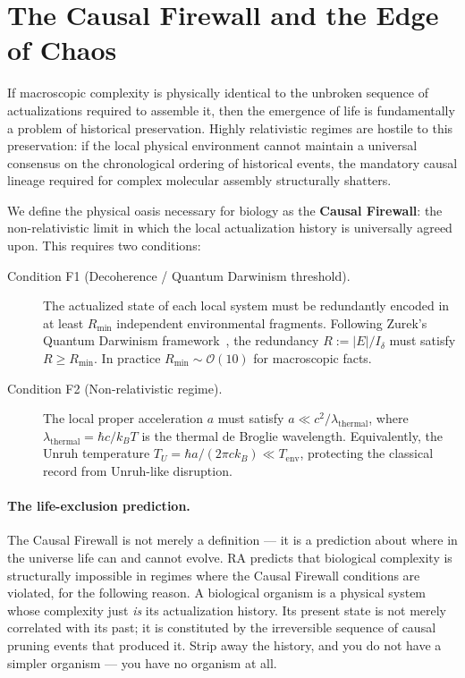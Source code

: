 \documentclass[11pt,a4paper]{article}
\theoremstyle{plain}
\theoremstyle{definition}
\theoremstyle{remark}
\begin{document}
\section{The Causal Firewall and the Edge of Chaos}
\label{sec:firewall}

If macroscopic complexity is physically identical to the unbroken sequence of
actualizations required to assemble it, then the emergence of life is fundamentally
a problem of historical preservation. Highly relativistic regimes are hostile to
this preservation: if the local physical environment cannot maintain a universal
consensus on the chronological ordering of historical events, the mandatory causal
lineage required for complex molecular assembly structurally shatters.

We define the physical oasis necessary for biology as the \textbf{Causal Firewall}:
the non-relativistic limit in which the local actualization history is universally
agreed upon. This requires two conditions:

\begin{description}
  \item[Condition F1 (Decoherence / Quantum Darwinism threshold).]
  The actualized state of each local system must be redundantly encoded in at least
  $R_{\min}$ independent environmental fragments. Following Zurek's Quantum Darwinism
  framework~\citep{Zurek2009}, the redundancy $R := |E|/I_{\delta}$ must satisfy
  $R \geq R_{\min}$. In practice $R_{\min} \sim \mathcal{O}(10)$ for macroscopic
  facts.

  \item[Condition F2 (Non-relativistic regime).]
  The local proper acceleration $a$ must satisfy $a \ll c^{2}/\lambda_{\mathrm{thermal}}$,
  where $\lambda_{\mathrm{thermal}} = \hbar c / k_{B}T$ is the thermal de Broglie
  wavelength. Equivalently, the Unruh temperature
  $T_{U} = \hbar a/(2\pi c k_{B}) \ll T_{\mathrm{env}}$, protecting the classical
  record from Unruh-like disruption.
\end{description}

\paragraph{The life-exclusion prediction.}
The Causal Firewall is not merely a definition --- it is a prediction about where
in the universe life can and cannot evolve. RA predicts that biological complexity
is structurally impossible in regimes where the Causal Firewall conditions are
violated, for the following reason. A biological organism is a physical system
whose complexity just \emph{is} its actualization history. Its present state is not
merely correlated with its past; it is constituted by the irreversible sequence of
causal pruning events that produced it. Strip away the history, and you do not have
a simpler organism --- you have no organism at all.
\end{document}
